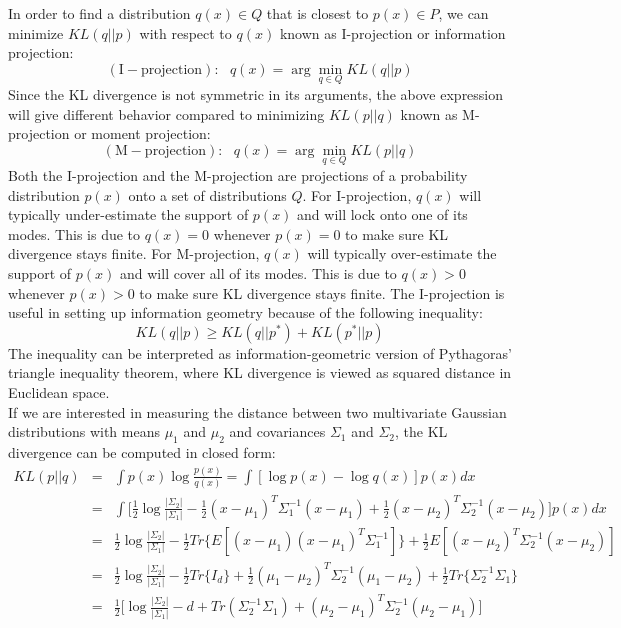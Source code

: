 In order to find a distribution $q(x) \in Q$ that is closest to $p(x) \in P$, we can minimize $KL(q||p)$ with respect to $q(x)$ known as I-projection or information projection:
\begin{equation}
    (\mathrm{I-projection}): ~~~ q(x) = \arg \min_{q \in Q} KL(q||p)
\end{equation}
Since the KL divergence is not symmetric in its arguments, the above expression will give different behavior compared to minimizing $KL(p||q)$ known as M-projection or moment projection:
\begin{equation}
    (\mathrm{M-projection}): ~~~ q(x) = \arg \min_{q \in Q} KL(p||q)
\end{equation}
Both the I-projection and the M-projection are projections of a probability distribution $p(x)$ onto a set of distributions $Q$. For I-projection, $q(x)$ will typically under-estimate the support of $p(x)$ and will lock onto one of its modes. This is due to $q(x)=0$ whenever $p(x)=0$ to make sure KL divergence stays finite. For M-projection, $q(x)$ will typically over-estimate the support of $p(x)$ and will cover all of its modes. This is due to $q(x)>0$ whenever $p(x)>0$ to make sure KL divergence stays finite. The I-projection is useful in setting up information geometry because of the following inequality:
\begin{equation}
    KL(q||p) \geq KL(q||p^{\ast}) + KL(p^{\ast}||p)
\end{equation}
The inequality can be interpreted as information-geometric version of Pythagoras' triangle inequality theorem, where KL divergence is viewed as squared distance in Euclidean space.\\
If we are interested in measuring the distance between two multivariate Gaussian distributions with means $\mu_1$ and $\mu_2$ and covariances $\Sigma_1$ and $\Sigma_2$, the KL divergence can be computed in closed form:
\begin{eqnarray}
    KL(p||q) &=& \int p(x) \log \frac{p(x)}{q(x)} = \int [\log p(x) - \log q(x)] p(x) dx \nonumber \\
    &=& \int \bigg[\frac{1}{2}\log\frac{|\Sigma_2|}{|\Sigma_1|}-\frac{1}{2}(x-\mu_1)^{T}\Sigma_{1}^{-1}(x-\mu_1) + \frac{1}{2}(x-\mu_2)^{T}\Sigma_{2}^{-1}(x-\mu_2)\bigg]p(x) dx \nonumber \\
    &=& \frac{1}{2}\log\frac{|\Sigma_2|}{|\Sigma_1|}-\frac{1}{2}Tr\{E[(x-\mu_1)(x-\mu_1)^{T}\Sigma_{1}^{-1}]\} + \frac{1}{2}E[(x-\mu_2)^{T}\Sigma_{2}^{-1}(x-\mu_2)] \nonumber \\
    &=& \frac{1}{2}\log\frac{|\Sigma_2|}{|\Sigma_1|}-\frac{1}{2}Tr\{I_d\}+\frac{1}{2}(\mu_1-\mu_2)^{T}\Sigma_{2}^{-1}(\mu_1 - \mu_2) + \frac{1}{2}Tr\{\Sigma_{2}^{-1}\Sigma_1\} \nonumber \\
    &=& \frac{1}{2}\bigg[\log\frac{|\Sigma_2|}{|\Sigma_1|}-d+Tr(\Sigma_{2}^{-1}\Sigma_1)+(\mu_2-\mu_1)^{T}\Sigma_{2}^{-1}(\mu_2 - \mu_1) \bigg]
\end{eqnarray}



